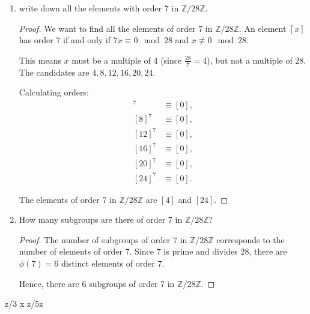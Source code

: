 \documentclass{article}
\begin{document}
\begin{enumerate}
    \item write down all the elements with order 7 in $\mathbb{Z}/28\mathbb{Z}$.
    \begin{proof}
        We want to find all the elements of order \(7\) in \(\mathbb{Z}/28\mathbb{Z}\). An element \([x]\) has order \(7\) if and only if \(7x \equiv 0 \mod 28\) and \(x \not\equiv 0 \mod 28\).

        This means \(x\) must be a multiple of \(4\) (since \( \frac{28}{7} = 4\)), but not a multiple of \(28\). The candidates are \(4, 8, 12, 16, 20, 24\).

        Calculating orders:
        \begin{align*}
            [4]^7 &\equiv [0], \\
            [8]^7 &\equiv [0], \\
            [12]^7 &\equiv [0], \\
            [16]^7 &\equiv [0], \\
            [20]^7 &\equiv [0], \\
            [24]^7 &\equiv [0].
        \end{align*}

        The elements of order \(7\) in \(\mathbb{Z}/28\mathbb{Z}\) are \([4]\) and \([24]\).
    \end{proof}

    \item How many subgroups are there of order 7 in \(\mathbb{Z}/28\mathbb{Z}\)?
    \begin{proof}
        The number of subgroups of order \(7\) in \(\mathbb{Z}/28\mathbb{Z}\) corresponds to the number of elements of order \(7\). Since \(7\) is prime and divides \(28\), there are \( \phi(7) = 6\) distinct elements of order \(7\).

        Hence, there are \(6\) subgroups of order \(7\) in \(\mathbb{Z}/28\mathbb{Z}\).
    \end{proof}
    
\end{enumerate}
z/3 x z/5z 
\end{document}
